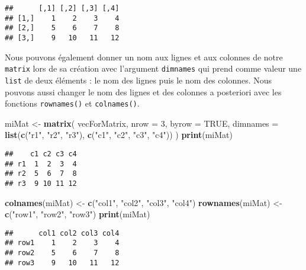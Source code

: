 \documentclass[]{book}
\newenvironment{Shaded}{\begin{snugshade}}{\end{snugshade}}
\newcommand{\KeywordTok}[1]{\textcolor[rgb]{0.13,0.29,0.53}{\textbf{#1}}}
\newcommand{\DataTypeTok}[1]{\textcolor[rgb]{0.13,0.29,0.53}{#1}}
\newcommand{\DecValTok}[1]{\textcolor[rgb]{0.00,0.00,0.81}{#1}}
\newcommand{\StringTok}[1]{\textcolor[rgb]{0.31,0.60,0.02}{#1}}
\newcommand{\OtherTok}[1]{\textcolor[rgb]{0.56,0.35,0.01}{#1}}
\newcommand{\NormalTok}[1]{#1}
\theoremstyle{definition}
\theoremstyle{definition}
\theoremstyle{definition}
\theoremstyle{remark}
\begin{document}
\begin{verbatim}
##      [,1] [,2] [,3] [,4]
## [1,]    1    2    3    4
## [2,]    5    6    7    8
## [3,]    9   10   11   12
\end{verbatim}

Nous pouvons également donner un nom aux lignes et aux colonnes de notre
\texttt{matrix} lors de sa création avec l'argument \texttt{dimnames}
qui prend comme valeur une \texttt{list} de deux éléments : le nom des
lignes puis le nom des colonnes. Nous pouvons aussi changer le nom des
lignes et des colonnes a posteriori avec les fonctions
\texttt{rownames()} et \texttt{colnames()}.

\begin{Shaded}
\begin{Highlighting}[]
\NormalTok{miMat <-}\StringTok{ }\KeywordTok{matrix}\NormalTok{(}
\NormalTok{  vecForMatrix, }
  \DataTypeTok{nrow =} \DecValTok{3}\NormalTok{, }
  \DataTypeTok{byrow =} \OtherTok{TRUE}\NormalTok{, }
  \DataTypeTok{dimnames =} \KeywordTok{list}\NormalTok{(}\KeywordTok{c}\NormalTok{(}\StringTok{"r1"}\NormalTok{, }\StringTok{"r2"}\NormalTok{, }\StringTok{"r3"}\NormalTok{), }\KeywordTok{c}\NormalTok{(}\StringTok{"c1"}\NormalTok{, }\StringTok{"c2"}\NormalTok{, }\StringTok{"c3"}\NormalTok{, }\StringTok{"c4"}\NormalTok{))}
\NormalTok{)}
\KeywordTok{print}\NormalTok{(miMat)}
\end{Highlighting}
\end{Shaded}

\begin{verbatim}
##    c1 c2 c3 c4
## r1  1  2  3  4
## r2  5  6  7  8
## r3  9 10 11 12
\end{verbatim}

\begin{Shaded}
\begin{Highlighting}[]
\KeywordTok{colnames}\NormalTok{(miMat) <-}\StringTok{ }\KeywordTok{c}\NormalTok{(}\StringTok{"col1"}\NormalTok{, }\StringTok{"col2"}\NormalTok{, }\StringTok{"col3"}\NormalTok{, }\StringTok{"col4"}\NormalTok{)}
\KeywordTok{rownames}\NormalTok{(miMat) <-}\StringTok{ }\KeywordTok{c}\NormalTok{(}\StringTok{"row1"}\NormalTok{, }\StringTok{"row2"}\NormalTok{, }\StringTok{"row3"}\NormalTok{)}
\KeywordTok{print}\NormalTok{(miMat)}
\end{Highlighting}
\end{Shaded}

\begin{verbatim}
##      col1 col2 col3 col4
## row1    1    2    3    4
## row2    5    6    7    8
## row3    9   10   11   12
\end{verbatim}
\end{document}
